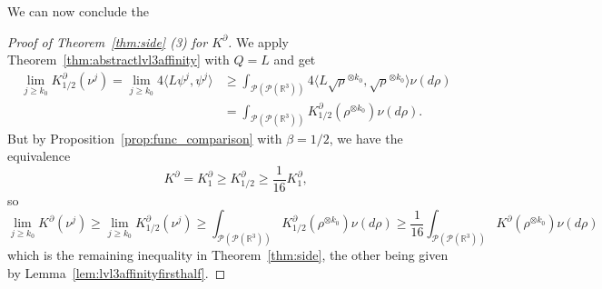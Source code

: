 \documentclass[11pt,a4paper]{article}
\theoremstyle{definition}
\theoremstyle{plain}
\begin{document}
    We can now conclude the
    \begin{proof}[Proof of Theorem~\ref{thm:side} (3) for $K^\partial$]
    We apply Theorem~\ref{thm:abstractlvl3affinity} with $Q=L$ and get
    \begin{align*}
        \lim_{j\geq k_0}K^\partial_{1/2}(\nu^j)=\lim_{j\geq k_0}  4\langle L\psi^j,\psi^j\rangle &\geq \int_{\mathcal{P}(\mathcal{P}(\mathbb{R}^{3}))} 4\langle L \sqrt\rho^{\otimes k_0},\sqrt\rho^{\otimes k_0}\rangle \nu(d\rho)\\
        &=\int_{\mathcal{P}(\mathcal{P}(\mathbb{R}^{3}))} K^\partial_{1/2}(\rho^{\otimes k_0}) \nu(d\rho).
    \end{align*}
    But by Proposition~\ref{prop:func_comparison} with $\beta=1/2$, we have the equivalence
    $$K^\partial=K^\partial_1 \geq K^\partial_{1/2}  \geq  \frac{1}{16} K^\partial_{1},$$
    so
    $$\lim_{j\geq k_0}K^\partial(\nu^j)\geq \lim_{j\geq k_0}K_{1/2}^\partial(\nu^j)\geq \int_{\mathcal{P}(\mathcal{P}(\mathbb{R}^{3}))} K^\partial_{1/2}(\rho^{\otimes k_0}) \nu(d\rho)\geq \frac{1}{16}\int_{\mathcal{P}(\mathcal{P}(\mathbb{R}^{3}))} K^\partial(\rho^{\otimes k_0}) \nu(d\rho)$$
    which is the remaining inequality in Theorem~\ref{thm:side}, the other being given by Lemma~\ref{lem:lvl3affinityfirsthalf}.
\end{proof}

\appendix
\end{document}
